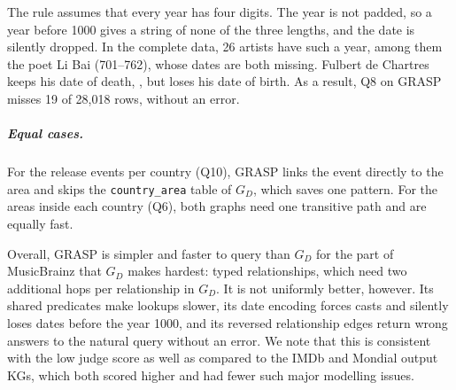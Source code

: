 The rule assumes that every year has four digits. The year is not padded, so a year before 1000 gives a string of none of the three lengths, and the date is silently dropped. In the complete data, 26 artists have such a year, among them the poet Li Bai (701--762), whose dates are both missing. Fulbert de Chartres keeps his date of death, , but loses his date of birth. As a result, Q8 on GRASP misses 19 of 28{,}018 rows, without an error. 


\subparagraph{Equal cases.}
For the release events per country (Q10), GRASP links the event directly to the area and skips the \texttt{country\_area} table of \(G_D\), which saves one pattern. For the areas inside each country (Q6), both graphs need one transitive path and are equally fast.

Overall, GRASP is simpler and faster to query than \(G_D\) for the part of MusicBrainz that \(G_D\) makes hardest: typed relationships, which need two additional hops per relationship in \(G_D\). It is not uniformly better, however. Its shared predicates make lookups slower, its date encoding forces casts and silently loses dates before the year 1000, and its reversed relationship edges return wrong answers to the natural query without an error. We note that this is consistent with the low judge score as well as compared to the IMDb and Mondial output KGs, which both scored higher and had fewer such major modelling issues.
